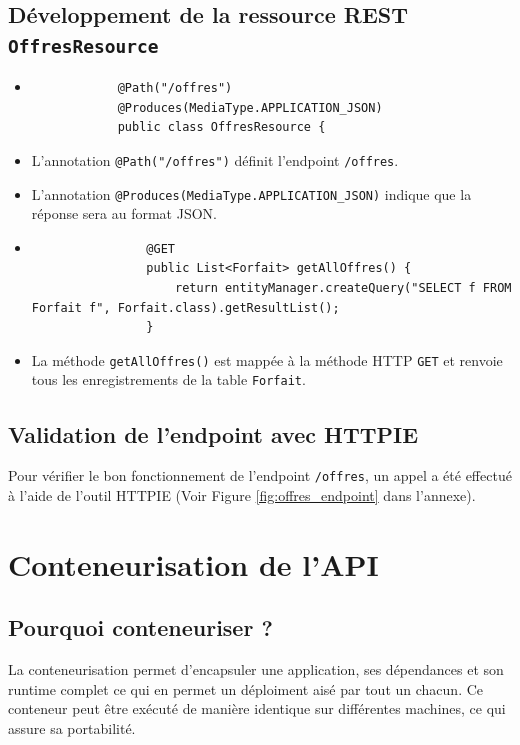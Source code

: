 \documentclass{article}
\begin{document}
	\subsection*{Développement de la ressource REST \texttt{OffresResource}}
	
	\begin{itemize}
		\item \begin{lstlisting}
			@Path("/offres")
			@Produces(MediaType.APPLICATION_JSON)
			public class OffresResource {
			\end{lstlisting}
			\item L'annotation \texttt{@Path("/offres")} définit l'endpoint \texttt{/offres}.
			\item L'annotation \texttt{@Produces(MediaType.APPLICATION\_JSON)} indique que la réponse sera au format JSON.
			
			\item \begin{lstlisting}
				@GET
				public List<Forfait> getAllOffres() {
					return entityManager.createQuery("SELECT f FROM Forfait f", Forfait.class).getResultList();
				}
			\end{lstlisting}
			\item La méthode \texttt{getAllOffres()} est mappée à la méthode HTTP \texttt{GET} et renvoie tous les enregistrements de la table \texttt{Forfait}.
		\end{itemize}

	\subsection*{Validation de l'endpoint avec HTTPIE}
	
	Pour vérifier le bon fonctionnement de l'endpoint \texttt{/offres}, un appel a été effectué à l'aide de l'outil HTTPIE (Voir Figure \ref{fig:offres_endpoint} dans l'annexe).
	
	\section{Conteneurisation de l'API}
	
	\subsection*{Pourquoi conteneuriser ?}
	
	La conteneurisation permet d'encapsuler une application, ses dépendances et son runtime complet ce qui en permet un déploiment aisé par tout un chacun. Ce conteneur peut être exécuté de manière identique sur différentes machines, ce qui assure sa portabilité.
	
\end{document}
